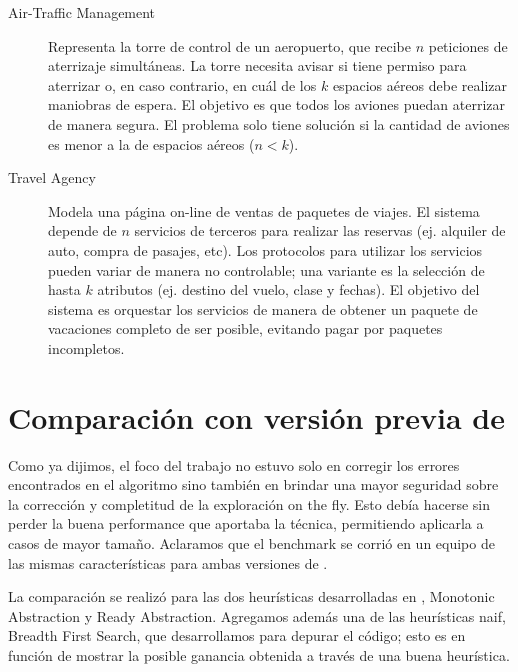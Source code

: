 \begin{description}
    \item [Air-Traffic Management] Representa la torre de control de un aeropuerto, que recibe $n$ peticiones de aterrizaje simultáneas. La torre necesita avisar si tiene permiso para aterrizar o, en caso contrario, en cuál de los $k$ espacios aéreos debe realizar maniobras de espera. El objetivo es que todos los aviones puedan aterrizar de manera segura. El problema solo tiene solución si la cantidad de aviones es menor a la de espacios aéreos ($n<k$).
    
    \item [Travel Agency] Modela una página on-line de ventas de paquetes de viajes. El sistema depende de $n$ servicios de terceros para realizar las reservas (ej. alquiler de auto, compra de pasajes, etc). Los protocolos para utilizar los servicios pueden variar de manera no controlable; una variante es la selección de hasta $k$ atributos (ej. destino del vuelo, clase y fechas). El objetivo del sistema es orquestar los servicios de manera de obtener un paquete de vacaciones completo de ser posible, evitando pagar por paquetes incompletos.
\end{description}

\section{Comparación con versión previa de \DCS}
Como ya dijimos, el foco del trabajo no estuvo solo en corregir los errores encontrados en el algoritmo sino también en brindar una mayor seguridad sobre la corrección y completitud de la exploración on the fly. Esto debía hacerse sin perder la buena performance que aportaba la técnica, permitiendo aplicarla a casos de mayor tamaño. Aclaramos que el benchmark se corrió en un equipo de las mismas características para ambas versiones de \DCS.

La comparación se realizó para las dos heurísticas desarrolladas en \cite{tesisDani}, Monotonic Abstraction y Ready Abstraction. Agregamos además una de las heurísticas naif, Breadth First Search, que desarrollamos para depurar el código; esto es en función de mostrar la posible ganancia obtenida a través de una buena heurística.

